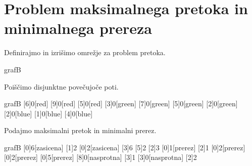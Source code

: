 \documentclass{article}
\begin{document}
\clearpage

\section{Problem maksimalnega pretoka in minimalnega prereza}

Definirajmo in izrišimo omrežje za problem pretoka.


\begin{pretok}{grafB}
\end{pretok}

\noindent
Poiščimo disjunktne povečujoče poti.

\begin{pretok}{grafB}
    \nicle
    [6]{0}[red]
    [9]{0}[red]
    [5]{0}[red]
    [3]{0}[green]
    [7]{0}[green]
    [5]{0}[green]
    [2]{0}[green]
    [2]{0}[blue]
    [1]{0}[blue]
    [4]{0}[blue]
\end{pretok}

\noindent
Podajmo maksimalni pretok in minimalni prerez.

\begin{pretok}{grafB}
    \nicle
    [0]{6}[zasicena]
    [1]{2}
    [0]{2}[zasicena]
    [3]{6}
    [5]{2}
    [2]{3}
    [0]{1}[prerez]
    [2]{1}
    [0]{2}[prerez]
    [0]{2}[prerez]
    [0]{5}[prerez]
    [8]{0}[nasprotna]
    [3]{1}
    [3]{0}[nasprotna]
    [2]{2}

\end{pretok}
\end{document}
